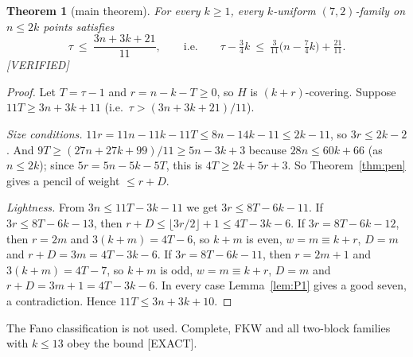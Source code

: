 \documentclass[11pt]{article}
\newtheorem{theorem}{Theorem}[section]
\theoremstyle{definition}
\newcommand{\st}[1]{\textsf{\small[#1]}}
\begin{document}
\begin{theorem}[main theorem]\label{thm:main}
For every $k\ge1$, every $k$-uniform $(7,2)$-family on $n\le2k$ points satisfies
\[
\tau\ \le\ \frac{3n+3k+21}{11},\qquad\text{i.e.}\qquad \tau-\tfrac34k\ \le\ \tfrac3{11}\big(n-\tfrac74k\big)+\tfrac{21}{11}.
\]
\st{VERIFIED}
\end{theorem}
\begin{proof}
Let $T=\tau-1$ and $r=n-k-T\ge0$, so $H$ is $(k+r)$-covering. Suppose $11T\ge3n+3k+11$ (i.e.\ $\tau>(3n+3k+21)/11$).

\emph{Size conditions.} $11r=11n-11k-11T\le8n-14k-11\le2k-11$, so $3r\le2k-2$. And $9T\ge(27n+27k+99)/11\ge5n-3k+3$
because $28n\le60k+66$ (as $n\le2k$); since $5r=5n-5k-5T$, this is $4T\ge2k+5r+3$. So Theorem~\ref{thm:pen} gives a pencil
of weight $\le r+D$.

\emph{Lightness.} From $3n\le11T-3k-11$ we get $3r\le8T-6k-11$. If $3r\le8T-6k-13$, then
$r+D\le\lfloor3r/2\rfloor+1\le4T-3k-6$. If $3r=8T-6k-12$, then $r=2m$ and $3(k+m)=4T-6$, so $k+m$ is even, $w=m\equiv k+r$,
$D=m$ and $r+D=3m=4T-3k-6$. If $3r=8T-6k-11$, then $r=2m+1$ and $3(k+m)=4T-7$, so $k+m$ is odd, $w=m\equiv k+r$, $D=m$
and $r+D=3m+1=4T-3k-6$. In every case Lemma~\ref{lem:P1} gives a good seven, a contradiction. Hence $11T\le3n+3k+10$.
\end{proof}
The Fano classification is not used. Complete, FKW and all two-block families with $k\le13$ obey the bound \st{EXACT}.
\end{document}
